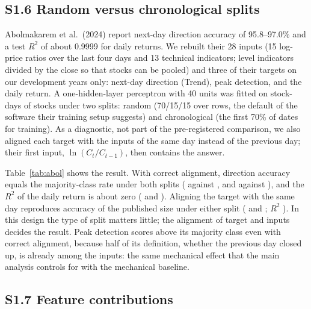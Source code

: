 \begin{table}[H]
\centering
\caption{Decile calibration by model, test years 2017--2026: the mean and the largest absolute gap
between the predicted and the observed (Kaplan--Meier) probability of reversal within 5, 10 and 20
sessions, over ten deciles of predicted probability.}\label{tab:calibration}
\footnotesize
{}
\end{table}

\subsection*{S1.6 Random versus chronological splits}
Abolmakarem et al.\ (2024) report next-day direction accuracy of 95.8--97.0\% and a test $R^2$ of
about 0.9999 for daily returns. We rebuilt their 28 inputs (15 log-price ratios over the last four
days and 13 technical indicators; level indicators divided by the close so that stocks can be
pooled) and three of their targets on our development years only: next-day direction (Trend), peak
detection, and the daily return. A one-hidden-layer perceptron with 40 units was fitted on
\AbolRows{} stock-days of \AbolStocks{} stocks under two splits: random (70/15/15 over rows, the
default of the software their training setup suggests) and chronological (the first 70\% of dates
for training). As a diagnostic, not part of the pre-registered comparison, we also aligned each
target with the inputs of the same day instead of the previous day; their first input,
$\ln(C_t/C_{t-1})$, then contains the answer.

Table~\ref{tab:abol} shows the result. With correct alignment, direction accuracy equals the
majority-class rate under both splits (\AbolRandomNextTrend{} against \AbolRandomNextTrendBase{},
and \AbolChronologicalNextTrend{} against \AbolChronologicalNextTrendBase), and the $R^2$ of the
daily return is about zero (\AbolRandomNextRet{} and \AbolChronologicalNextRet). Aligning the target
with the same day reproduces accuracy of the published size under either split
(\AbolRandomSameTrend{} and \AbolChronologicalSameTrend; $R^2$ \AbolRandomSameRet). In this design
the type of split matters little; the alignment of target and inputs decides the result. Peak
detection scores above its majority class even with correct alignment, because half of its
definition, whether the previous day closed up, is already among the inputs: the same mechanical
effect that the main analysis controls for with the mechanical baseline.

\begin{table}[H]
\centering
\caption{The design of Abolmakarem et al.\ (2024) on our development years (2012--2016), test-set
results. Majority class: accuracy of always predicting the more frequent class.}\label{tab:abol}
\footnotesize
{}
\end{table}

\subsection*{S1.7 Feature contributions}
